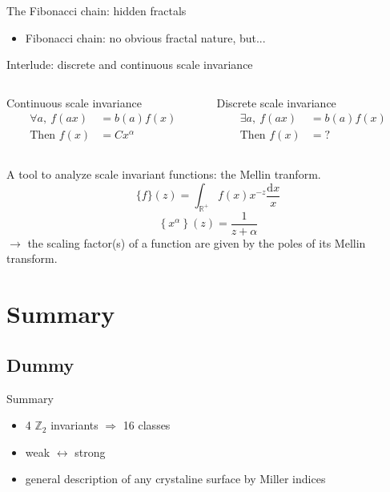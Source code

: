 \documentclass[xcolor=x11names,compress,professionalfonts]{beamer}
\renewcommand{\(}{\begin{columns}}
\renewcommand{\)}{\end{columns}}
\newcommand{\<}[1]{\begin{column}{#1}}
\renewcommand{\>}{\end{column}}
\renewcommand{\d}[1]{\mathrm{d}#1}
\begin{document}
\begin{frame}{The Fibonacci chain: hidden fractals}
    \begin{itemize}
    	\item Fibonacci chain: no obvious fractal nature, but...
    \end{itemize}
\end{frame}

\begin{frame}{Interlude: discrete and continuous scale invariance}
    \begin{columns}
\newcommand{\s}{.2}
  \begin{column}{5cm}
  	\begin{block}{Continuous scale invariance}
  	\begin{align*}
		\forall a,~ f(ax) &= b(a) f(x) \\
		\text{Then } f(x) &= C x^\alpha
	\end{align*}
  	\end{block}
  \end{column}

  \begin{column}{5cm}
  	\begin{block}{Discrete scale invariance}
  	\begin{align*}
		\exists a,~ f(ax) &= b(a) f(x) \\
		\text{Then } f(x) &= ?
	\end{align*}
  	\end{block}
  \end{column}
\end{columns}
A tool to analyze scale invariant functions: the Mellin tranform.
\[ \{ f \}(z) = \int_{\mathbb{R}^+} f(x) x^{-z} \frac{\d{x}}{x} \]
\[ \left\{ x^\alpha \right\}(z) = \frac{1}{z + \alpha} \]
$\rightarrow$ the scaling factor(s) of a function are given by the poles of its Mellin transform.
\end{frame}

\section{Summary}
\subsection{Dummy}

\begin{frame}{Summary}

    \begin{itemize}
        \item 4 $\mathbb{Z}_2$ invariants $\Rightarrow$ 16 classes
        \item weak $\leftrightarrow$ strong
        \item general description of any crystaline surface by Miller indices
    \end{itemize}
\end{frame}
\end{document}
